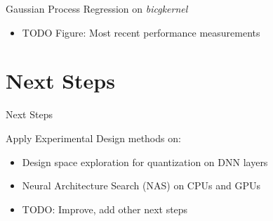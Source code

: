 \documentclass[10pt, compress, aspectratio=169, xcolor={table,usenames,dvipsnames}]{beamer}
\begin{document}
\begin{frame}[label={sec:orgfc2e94f}]{Gaussian Process Regression on \emph{bicgkernel}}
\begin{itemize}
\item TODO Figure: Most recent \alert{performance measurements}
\end{itemize}
\end{frame}
\section{Next Steps}
\label{sec:orgfb14950}
\begin{frame}[label={sec:orge16cd75}]{Next Steps}
\begin{block}{Apply Experimental Design methods on:}
\begin{itemize}
\item Design space exploration for \alert{quantization} on DNN layers
\item Neural Architecture Search (\alert{NAS}) on CPUs and GPUs
\item TODO: Improve, add other next steps
\end{itemize}
\end{block}
\end{frame}
\maketitle
\end{document}

